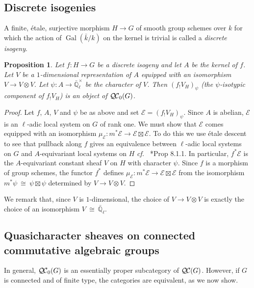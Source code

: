 \documentclass[CM,Submssn,SecEq]{degruyter-crelle} %
\theoremstyle{plain}
\newtheorem{proposition}[theorem]{Proposition}
\theoremstyle{definition}
\theoremstyle{remark}
\newcommand{\EE}{\mathbb{\bar Q}_\ell}
\newcommand{\bFq}{\bar{k}}
\newcommand{\Fq}{k}
\newcommand{\EEx}{\EE^\times}
\DeclareMathOperator{\Gal}{Gal}
\newcommand{\iso}{{\ \cong\ }}
\newcommand{\qcs}[1]{{\mathcal{#1}}}
\newcommand{\QC}{{\mathcal{Q\hskip-0.8pt C}}}
\newcommand{\bQC}{{\QC_0}}
\begin{document}
\subsection{Discrete isogenies}\label{ssec:discrete_isogenies}

A finite, \'etale, surjective morphism $H\to G$ of smooth group schemes over $\Fq$ for which the action of $\Gal(\bFq/\Fq)$ on the kernel is trivial is called a {\it discrete isogeny}.

\begin{proposition}\label{prop:finite}
Let $f: H \to G$ be a discrete isogeny and let $A$ be the kernel of $f$.
Let $V$ be a $1$-dimensional representation of $A$ 
equipped with an isomorphism $V\to V\otimes V$.
Let $\psi : A \to \EEx$ be the character of $V$.
Then $(f_! V_H)_\psi$ (the $\psi$-isotypic component of $f_!V_H$) is an object of $\bQC(G)$.
\end{proposition}

\begin{proof}
Let $f$, $A$, $V$ and $\psi$ be as above and set $\qcs{E} = (f_! V_H)_\psi$.
Since $A$ is abelian, $\qcs{E}$ is an $\ell$-adic local system on $G$ of rank one.
We must show that $\qcs{E}$ comes equipped with an isomorphism $\mu_\qcs{E} : m^* \qcs{E} \to \qcs{E}\boxtimes\qcs{E}$.
To do this we use \'etale descent to see that pullback along $f$ gives an equivalence between $\ell$-adic local systems on $G$ and $A$-equivariant local systems on $H$ {\it cf.\ } \cite{bernstein-luntz:equivariant_sheaves}*{Prop 8.1.1}. 
In particular, $f^*\qcs{E}$ is the $A$-equivariant constant sheaf $V$ on $H$ with character $\psi$.
Since $f$ is a morphism of group schemes, the functor $f^*$ defines $\mu_\qcs{E} : m^*\qcs{E} \to \qcs{E}\boxtimes\qcs{E}$
from the isomorphism $m^*\psi \iso \psi \boxtimes\psi$ determined by $V\to V\otimes V$.
\end{proof}

We remark that, since $V$ is $1$-dimensional, the choice of $V \to V\otimes V$ is exactly the choice of an isomorphism $V\iso \EE$.

\subsection{Quasicharacter sheaves on connected commutative algebraic groups}\label{ssec:connected}

In general, $\bQC(G)$ is an essentially
proper subcategory of $\QC(G)$. 
However, if $G$ is connected and of finite type, the categories are equivalent, as we now show.
\end{document}
